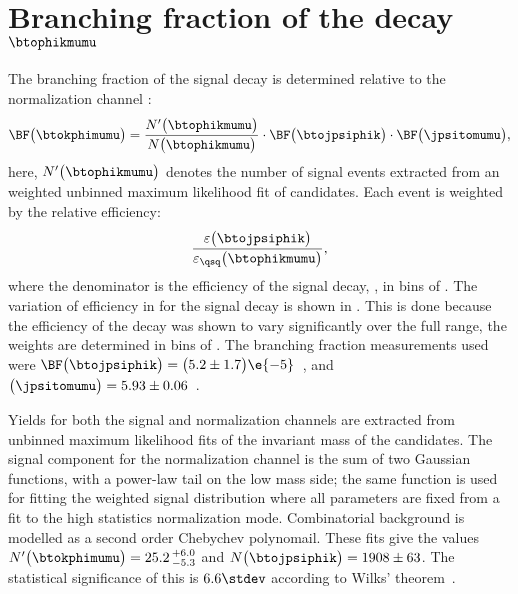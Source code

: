 \section[Branching fraction of the decay \btophikmumu]
{Branching fraction of the decay $\boldsymbol{\btophikmumu}$}

The branching fraction of the signal decay \btophikmumu is determined relative to the normalization
channel \btojpsiphik:
\begin{equation}
  \BF\big(\btokphimumu\big)=
  \frac{ N^\prime\big(\btophikmumu\big) }{ N\big(\btophikmumu\big) }
  \cdot\BF\big(\btojpsiphik\big)
  \cdot\BF\big(\jpsitomumu\big),
\end{equation}
here, $N^\prime\big(\btophikmumu\big)$ denotes the number of signal events extracted from an
weighted unbinned maximum likelihood fit of \btophikmumu candidates.
Each event is weighted by the relative efficiency:
\begin{equation}
  \frac{\varepsilon\big(\btojpsiphik\big)}{\varepsilon_{\qsq}\big(\btophikmumu\big)},
\end{equation}
where the denominator is the efficiency of the signal decay, \btophikmumu, in bins of \qsq.
The variation of efficiency in \qsq for the signal decay is shown in
.
This is done because the efficiency of the decay \btophikmumu was shown to vary significantly over
the full \qsq range, the weights are determined in bins of \qsq.
The branching fraction measurements used were
$\BF\big(\btojpsiphik\big)=\big(5.2\pm1.7\big)\e{-5}$~\cite{PDG2012},
and $\big(\jpsitomumu\big)=5.93\pm0.06$~\cite{PDG2012}.


Yields for both the signal and normalization channels are extracted from unbinned maximum
likelihood fits of the invariant mass of the \Bp candidates.
The signal component for the normalization channel is the sum of two Gaussian functions, with a
power-law tail on the low mass side; the same function is used for fitting the weighted signal
distribution where all parameters are fixed from a fit to the high statistics normalization mode.
Combinatorial background is modelled as a second order Chebychev polynomail.
These fits give the values
$N^\prime\big(\btokphimumu\big)=25.2\,^{+6.0}_{-5.3}$ and
$N\big(\btojpsiphik\big)=1908\pm63$.
The statistical significance of this is $6.6\stdev$ according to Wilks' theorem~\cite{wilks1938}.

